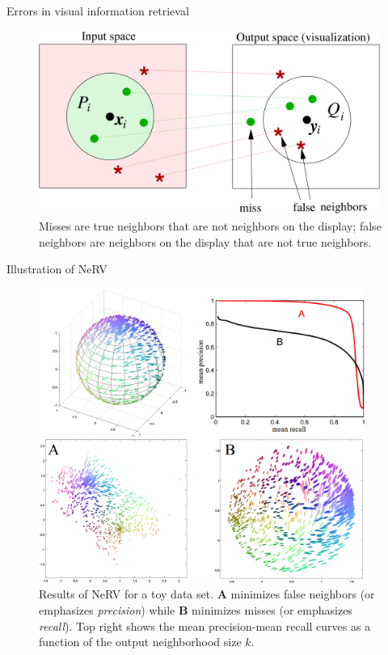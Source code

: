 \documentclass[first=dgreen,second=purple,logo=yellowexc]{aaltoslides}
\begin{document}
\begin{frame}{Errors in visual information retrieval}
\begin{figure}
\centering
\includegraphics[width=\textwidth]{figures/retrieval_illustration.pdf}
\caption{\footnotesize{Misses are true neighbors that are not neighbors on the display; false neighbors are neighbors on the display that are not true neighbors.}}
\end{figure}
\end{frame}


\begin{frame}{Illustration of NeRV}
\begin{figure}
\begin{columns}
\begin{column}{0.65\textwidth}
\includegraphics[width=\textwidth]{figures/demo.png}
\end{column}
\begin{column}{0.3\textwidth}
\caption{\scriptsize{Results of NeRV for a toy data set. \textbf{A} minimizes false neighbors (or emphasizes \emph{precision}) while \textbf{B} minimizes misses (or emphasizes \emph{recall}). Top right shows the mean precision-mean recall curves as a function of the output neighborhood size $k$.}}
\end{column}
\end{columns}
\end{figure}
\end{frame}
\end{document}
